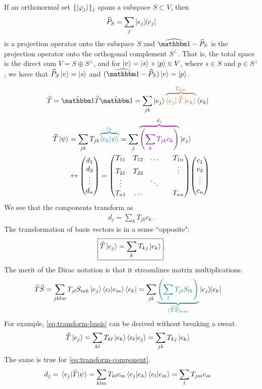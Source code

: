 If an orthonormal set $\{\ket{\varphi_j}\}_j$ spans a subspace $S \subset V$, then 
\begin{align}
	\op P_S = \sum_j \dyad{e_j} 
\end{align}
is a projection operator onto the subspace $S$ and
$\op \id - \op P_S$
is the projection operator onto the orthogonal complement $S^{\perp}$. That is, the total space is the direct sum
$V = S \oplus S^{\perp}$,
and for $\ket v = \ket s + \ket p\in V$, where $s\in S$ and $p\in S^{\perp}$, we have that $\widehat{P}_S\ket v = \ket s$ and $(\op\id - \op P_S)\ket v = \ket p$.

\vspace{0.5em}
\begin{align}
	\op T &= \hat\id \op T \hat\id = \sum_{jk} \ket{e_j} {\color{maincolor}\overbrace{\bra{e_j}\op T \ket{e_k}}^{T_{nm}}} \bra{e_k} 
\end{align}
\begin{align}
	\op T\ket{\psi} &= \sum_{jk} T_{jk} {\color{eqcolor}\overbrace{\av{e_k|\psi}}^{c_k}} = \sum_j {\color{darkmagenta}\overbrace{\left(\sum_k T_{jk}c_k \right)}^{d_j}} \ket{e_j} \\
	&\leftrightarrow \mqty(d_1 \\ d_2 \\  \vdots \\ d_n) = \mqty(T_{11}&T_{12}& \dots & & T_{1n} \\ T_{21}& T_{22} & & & \vdots \\ \vdots & & \ddots & & \\ T_{n1} & \dots & & & T_{nn})  \mqty(c_1 \\ c_2 \\ \vdots \\ c_n)
\end{align}
We see that the components transform as
\begin{align}\label{eq:transform-component}
	\boxed{d_j = \sum_k T_{jk} c_k}\,.
\end{align}
The transformation of basis vectors is in a sense ``opposite":
\begin{align}\label{eq:transform-basis}
	\boxed{\widehat{T} \ket{e_j} = \sum_k T_{kj}\ket{e_k}}.
\end{align}
The merit of the Dirac notation is that it streamlines matrix multiplications.
\begin{align}
	\op T \op S &= \sum_{jklm} T_{jl}S_{mk} \ket{e_j}\av{e_l|e_m}\bra{e_k}	
	= \sum_{jk} {\color{teal}\underbrace{\left(\sum_l T_{jl}S_{lk}\right)}_{(\op T \op S)_{nm}}}  \dyad{e_j}{e_k} 
\end{align}
For example, \eqref{eq:transform-basis} can be derived without breaking a sweat.
\begin{align}
	\widehat{T}\ket{e_j} &= \sum_{kl} T_{kl} \ket{e_k}\left\langle e_l|e_j \right\rangle = \sum_{jk} T_{kj} \ket{e_k}
\end{align}
The same is true for \eqref{eq:transform-component}.
\begin{align}
	d_j &= \mel{e_j}{\widehat{T}}{\psi} = \sum_{klm} T_{kl} c_m \left\langle e_j|e_k \right\rangle \left\langle e_l|e_m \right\rangle 
		= \sum_l T_{jm} c_m 
\end{align}

